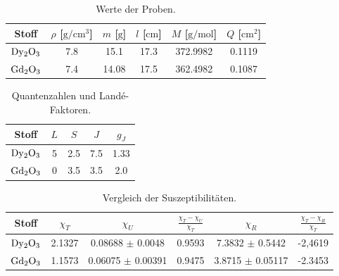 \begin{table}
  \centering
  \caption{Werte der Proben.}
  \label{tab:Proben}
  \begin{tabular}{c c c c c c }
    \toprule
    {Stoff} & {$\rho$ [$\si{\gram\per\centi\metre\cubed}$]} & {$m$ [$\si{\gram}$]} & {$l$ [$\si{\centi\metre}$]} & {$M$ [$\si{\gram\per\mole}$]} & {$Q$ [$\si{\centi\metre\squared}$]}\\
    \midrule
    $\ce{Dy2O3}$ & 7.8 & 15.1 & 17.3 & 372.9982 & 0.1119\\
    $\ce{Gd2O3}$ & 7.4 & 14.08 & 17.5 & 362.4982 & 0.1087\\
    \bottomrule
  \end{tabular}
\end{table}

\begin{table}
  \centering
  \caption{Quantenzahlen und Landé-Faktoren.}
  \begin{tabular}{c c c c c }
    \toprule
    {Stoff} & {$L$} & {$S$} & {$J$} & {$g_J$}\\
    \midrule
    $\ce{Dy2O3}$ & 5 & 2.5 & 7.5 & 1.33\\
    $\ce{Gd2O3}$ & 0 & 3.5 & 3.5 & 2.0\\
    \bottomrule
  \end{tabular}
\end{table}

\begin{table}
  \centering
  \caption{Vergleich der Suszeptibilitäten.}
  \begin{tabular}{c c c c c c}
    \toprule
    {Stoff} & {$\chi_T$} &{$\chi_U$} & {$\frac{\chi_T - \chi_U}{\chi_T}$} & {$\chi_R$} & {$\frac{\chi_T - \chi_R}{\chi_T}$}\\
    \midrule
    $\ce{Dy2O3}$ & 2.1327 & 0.08688 $\pm$ 0.0048 & 0.9593 & 7.3832 $\pm$ 0.5442&  -2,4619\\
    $\ce{Gd2O3}$ & 1.1573 &  0.06075 $\pm$  0.00391 & 0.9475 &3.8715 $\pm$ 0.05117 & -2.3453 \\
    \bottomrule
  \end{tabular}
\end{table}